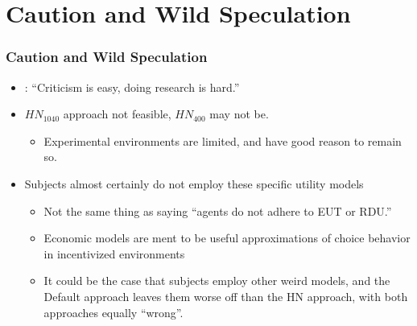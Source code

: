 \documentclass{beamer}
\begin{document}
\section{Caution and Wild Speculation}
\begin{frame}
\frametitle{Caution and Wild Speculation}
\begin{itemize}
	\item \textcite{Gelman2013}: \enquote{Criticism is easy, doing research is hard.}
	\item ${HN}_{1040}$ approach not feasible, ${HN}_{400}$ may not be.
		\begin{itemize}
			\item Experimental environments are limited, and have good reason to remain so.
		\end{itemize}
	\item Subjects almost certainly do not employ these specific utility models
		\begin{itemize}
			\item Not the same thing as saying \enquote{agents do not adhere to EUT or RDU.}
			\item Economic models are ment to be useful approximations of choice behavior in incentivized environments
			\item It could be the case that subjects employ other weird models, and the Default approach leaves them worse off than the HN approach, with both approaches equally \enquote{wrong}.
		\end{itemize}
\end{itemize}
\end{frame}
\end{document}

